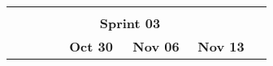 \begin{longtable}[c]{llclllllllllllllllll}
        \multicolumn{1}{|l|}{}                                                                & \multicolumn{1}{l|}{}                                                          & \multicolumn{1}{l|}{}                                                            & \multicolumn{1}{l|}{}                                                                &                                 &                                 &                                 &                                 &                                 &                                 &                                 &                                 &                                 &                                 &                                 &                                 &                                 &                                 & \multicolumn{1}{l|}{}                         &  \\ \cline{1-4}
        \multicolumn{19}{c}{\cellcolor[HTML]{305496}\textbf{Sprint 03}}                                                                                                                                                                                                                                                                                                                                                                                                                                                                                                                                                                                                                                                                                                                                                                                                                              &  \\ \cline{1-19}
        \multicolumn{1}{|c|}{}                                                                & \multicolumn{1}{c|}{}                                                          & \multicolumn{1}{c|}{}                                                            & \multicolumn{1}{c|}{}                                                                & \multicolumn{5}{c|}{\textbf{Oct 30}}                                                                                                                                    & \multicolumn{5}{c|}{\textbf{Nov 06}}                                                                                                                                    & \multicolumn{5}{c|}{\textbf{Nov 13}}                                                                                                                                                  &  \\ \cline{5-19}

\end{longtable}
